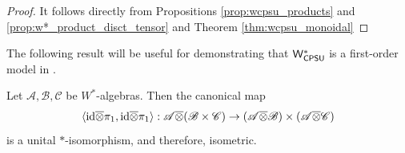 \begin{proof}
  It follows directly from Propositions \ref{prop:wcpsu_products} and \ref{prop:w*_product_disct_tensor} and Theorem \ref{thm:wcpsu_monoidal}
\end{proof}

The following result will be useful for demonstrating that $\mathsf{W^*_{CPSU}}$ is a first-order model in .

\begin{theorem} \cite[Theorem 3.2]{choSemanticsQuantumProgramming2016} \label{thm:w*_tensor_distributes_product}
  Let \( \mathscr{A}, \mathscr{B}, \mathscr{C} \) be \(W^*\)-algebras. Then the canonical map
\[
 \langle \mathrm{id} \overline{\otimes} \pi_1, \mathrm{id} \overline{\otimes} \pi_1 \rangle : \mathscr{A} \overline{\otimes} (\mathscr{B} \times \mathscr{C}) \to (\mathscr{A} \overline{\otimes} \mathscr{B}) \times (\mathscr{A} \overline{\otimes} \mathscr{C})
\]
is a unital $*$-isomorphism, and therefore, isometric.
\end{theorem}








